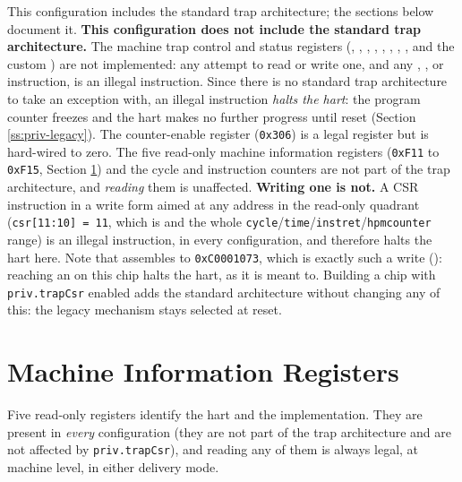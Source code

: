 \ifprivtrapcsr
This configuration includes the standard trap architecture; the sections below document it.
\else
\textbf{This configuration does not include the standard trap architecture.} The machine trap control and status registers (, , , , , , , ,  and the custom ) are not implemented: any attempt to read or write one, and any , ,  or  instruction, is an illegal instruction. Since there is no standard trap architecture to take an exception with, an illegal instruction \textit{halts the hart}: the program counter freezes and the hart makes no further progress until reset (Section \ref{ss:priv-legacy}). The counter-enable register  (\texttt{0x306}) is a legal register but is hard-wired to zero. The five read-only machine information registers (\texttt{0xF11} to \texttt{0xF15}, Section \ref{ss:priv-idcsrs}) and the cycle and instruction counters are not part of the trap architecture, and \textit{reading} them is unaffected. \textbf{Writing one is not.} A CSR instruction in a write form aimed at any address in the read-only quadrant (\texttt{csr[11:10] = 11}, which is  and the whole \texttt{cycle}/\texttt{time}/\texttt{instret}/\texttt{hpmcounter} range) is an illegal instruction, in every configuration, and therefore halts the hart here. Note that  assembles to \texttt{0xC0001073}, which is exactly such a write (): reaching an  on this chip halts the hart, as it is meant to. Building a chip with \texttt{priv.trapCsr} enabled adds the standard architecture without changing any of this: the legacy mechanism stays selected at reset.
\fi

\section{Machine Information Registers} \label{ss:priv-idcsrs}

Five read-only registers identify the hart and the implementation. They are present in \textit{every} configuration (they are not part of the trap architecture and are not affected by \texttt{priv.trapCsr}), and reading any of them is always legal, at machine level, in either delivery mode.

